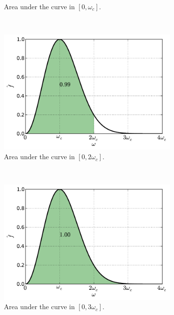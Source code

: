 \documentclass[12pt,letterpaper]{article}
\begin{document}
{\begin{figure}[h]
\begin{subfigure}[b]{0.45\textwidth}
        \caption{Area under the curve in $[0,\omega_c]$.}
    \end{subfigure}\
    \begin{subfigure}[b]{0.45\textwidth}
        \includegraphics[width=\textwidth]{img/ricker_area=2.pdf}
        \caption{Area under the curve in $[0,2\omega_c]$.}
    \end{subfigure}\\
    \begin{subfigure}[b]{0.45\textwidth}
        \includegraphics[width=\textwidth]{img/ricker_area=3.pdf}
        \caption{Area under the curve in $[0,3\omega_c]$.}
    \end{subfigure}
    \begin{subfigure}[b]{0.45\textwidth}

\end{subfigure}
\end{figure}}
\end{document}

